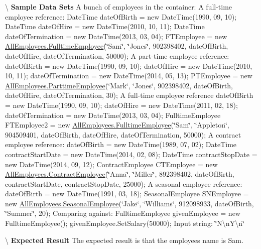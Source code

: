 \textbackslash{} {\bfseries  Sample Data Sets} A bunch of employees in the container\+: A full-\/time employee reference\+: Date\+Time date\+Of\+Birth = new Date\+Time(1990, 09, 10); Date\+Time date\+Of\+Hire = new Date\+Time(2010, 10, 11); Date\+Time date\+Of\+Termination = new Date\+Time(2013, 03, 04); F\+T\+Employee = new \hyperlink{class_all_employees_1_1_fulltime_employee}{All\+Employees.\+Fulltime\+Employee}(\char`\"{}\+Sam\char`\"{}, \char`\"{}\+Jones\char`\"{}, 902398402, date\+Of\+Birth, date\+Of\+Hire, date\+Of\+Termination, 50000); A part-\/time employee reference\+: date\+Of\+Birth = new Date\+Time(1990, 09, 10); date\+Of\+Hire = new Date\+Time(2010, 10, 11); date\+Of\+Termination = new Date\+Time(2014, 05, 13); P\+T\+Employee = new \hyperlink{class_all_employees_1_1_parttime_employee}{All\+Employees.\+Parttime\+Employee}(\char`\"{}\+Mark\char`\"{}, \char`\"{}\+Jones\char`\"{}, 902398402, date\+Of\+Birth, date\+Of\+Hire, date\+Of\+Termination, 30); A full-\/time employee reference date\+Of\+Birth = new Date\+Time(1990, 09, 10); date\+Of\+Hire = new Date\+Time(2011, 02, 18); date\+Of\+Termination = new Date\+Time(2013, 03, 04); Fulltime\+Employee F\+T\+Employee2 = new \hyperlink{class_all_employees_1_1_fulltime_employee}{All\+Employees.\+Fulltime\+Employee}(\char`\"{}\+Sam\char`\"{}, \char`\"{}\+Appleton\char`\"{}, 904509401, date\+Of\+Birth, date\+Of\+Hire, date\+Of\+Termination, 50000); A contract employee reference\+: date\+Of\+Birth = new Date\+Time(1989, 07, 02); Date\+Time contract\+Start\+Date = new Date\+Time(2014, 02, 08); Date\+Time contract\+Stop\+Date = new Date\+Time(2014, 09, 12); Contract\+Employee C\+T\+Employee = new \hyperlink{class_all_employees_1_1_contract_employee}{All\+Employees.\+Contract\+Employee}(\char`\"{}\+Anna\char`\"{}, \char`\"{}\+Miller\char`\"{}, 892398402, date\+Of\+Birth, contract\+Start\+Date, contract\+Stop\+Date, 25000); A seasonal employee reference\+: date\+Of\+Birth = new Date\+Time(1991, 03, 18); Seasonal\+Employee S\+N\+Employee = new \hyperlink{class_all_employees_1_1_seasonal_employee}{All\+Employees.\+Seasonal\+Employee}(\char`\"{}\+Jake\char`\"{}, \char`\"{}\+Williams\char`\"{}, 912098933, date\+Of\+Birth, \char`\"{}\+Summer\char`\"{}, 20); Comparing against\+: Fulltime\+Employee given\+Employee = new Fulltime\+Employee(); given\+Employee.\+Set\+Salary(50000); Input string\+: \char`\"{}\+N\textbackslash{}n\+Y\textbackslash{}n\char`\"{}

\textbackslash{} {\bfseries  Expected Result} The expected result is that the employee\textquotesingle{}s name is Sam.

